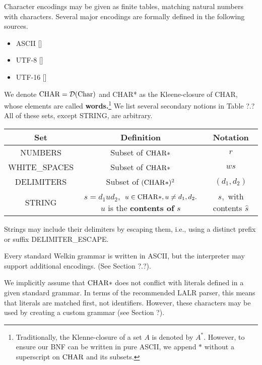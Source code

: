 Character encodings may be given as finite tables, matching natural numbers with characters. Several major encodings are formally defined in the following sources.
\begin{itemize}
	\item ASCII []
	\item UTF-8 []
	\item UTF-16 []
\end{itemize}

We denote $\mathrm{CHAR} = \mathcal{D}(\textrm{Char})$ and CHAR* as the
Kleene-closure of CHAR, whose elements are called \textbf{words.}\footnote{Traditionally, the Klenne-closure of a set $A$ is denoted by $A^{*}.$ However, to ensure our BNF
  can be written in pure ASCII, we append $*$ without a superscript on $\mathrm{CHAR}$ and its subsets.}
We list several secondary notions in Table ?.? All of these sets, except STRING, are arbitrary.
\begin{center}
  \bgroup
  \def\arraystretch{2.0}
\begin{tabular}{| c | c | c |}
  \hline
  \textbf{Set} & \textbf{Definition} & \textbf{Notation} \\
  \hline
  NUMBERS & Subset of $\mathrm{CHAR}*$ & $r$ \\
  \hline
  WHITE\_SPACES & Subset of $\mathrm{CHAR}*$ & $ws$ \\
  \hline
  DELIMITERS & Subset of $(\mathrm{CHAR}*)^{2}$ & $(d_{1}, d_{2})$ \\
  \hline
  STRING & \makecell{$s = d_{1}ud_{2},$ \\ $u \in \mathrm{CHAR}*, u \neq d_{1}, d_{2}.$ \\ $u$ is the \textbf{contents of} $s$ } & \makecell{$s,$ with \\ contents $\hat{s}$} \\
  \hline
\end{tabular}
\egroup
\end{center}

Strings may include their delimiters by escaping them, i.e., using a distinct prefix or suffix DELIMITER\_ESCAPE.

Every standard Welkin grammar is written in ASCII, but the interpreter may support additional encodings. (See Section ?.?).

We implicitly assume that $\mathrm{CHAR}*$ does not conflict with literals defined in a given standard grammar. In terms of the recommended LALR parser, this means that literals are matched first, not identifiers. However, these characters may be used by creating a custom grammar (see Section ?).


